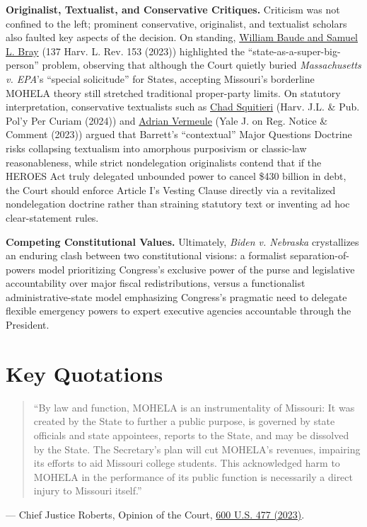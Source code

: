 \documentclass[12pt]{article}
\begin{document}
\textbf{Originalist, Textualist, and Conservative Critiques.} Criticism was not confined to the left; prominent conservative, originalist, and textualist scholars also faulted key aspects of the decision. On standing, \href{https://harvardlawreview.org/print/vol-137/proper-parties-proper-relief/}{William Baude and Samuel L. Bray} (137 Harv. L. Rev. 153 (2023)) highlighted the ``state-as-a-super-big-person'' problem, observing that although the Court quietly buried \textit{Massachusetts v. EPA}'s ``special solicitude'' for States, accepting Missouri's borderline MOHELA theory still stretched traditional proper-party limits. On statutory interpretation, conservative textualists such as \href{https://journals.law.harvard.edu/jlpp/placing-legal-context-in-context-chad-squitieri/}{Chad Squitieri} (Harv. J.L. \& Pub. Pol'y Per Curiam (2024)) and \href{https://www.yalejreg.com/nc/text-and-context-by-adrian-vermeule/}{Adrian Vermeule} (Yale J. on Reg. Notice \& Comment (2023)) argued that Barrett's ``contextual'' Major Questions Doctrine risks collapsing textualism into amorphous purposivism or classic-law reasonableness, while strict nondelegation originalists contend that if the HEROES Act truly delegated unbounded power to cancel \$430 billion in debt, the Court should enforce Article I's Vesting Clause directly via a revitalized nondelegation doctrine rather than straining statutory text or inventing ad hoc clear-statement rules.

\textbf{Competing Constitutional Values.} Ultimately, \textit{Biden v. Nebraska} crystallizes an enduring clash between two constitutional visions: a formalist separation-of-powers model prioritizing Congress's exclusive power of the purse and legislative accountability over major fiscal redistributions, versus a functionalist administrative-state model emphasizing Congress's pragmatic need to delegate flexible emergency powers to expert executive agencies accountable through the President.

\section{Key Quotations}

\begin{quote}
``By law and function, MOHELA is an instrumentality of Missouri: It was created by the State to further a public purpose, is governed by state officials and state appointees, reports to the State, and may be dissolved by the State. The Secretary's plan will cut MOHELA's revenues, impairing its efforts to aid Missouri college students. This acknowledged harm to MOHELA in the performance of its public function is necessarily a direct injury to Missouri itself.''
\end{quote}
\noindent --- Chief Justice Roberts, Opinion of the Court, \href{https://www.law.cornell.edu/supremecourt/text/22-506}{600 U.S. 477 (2023)}.
\end{document}
